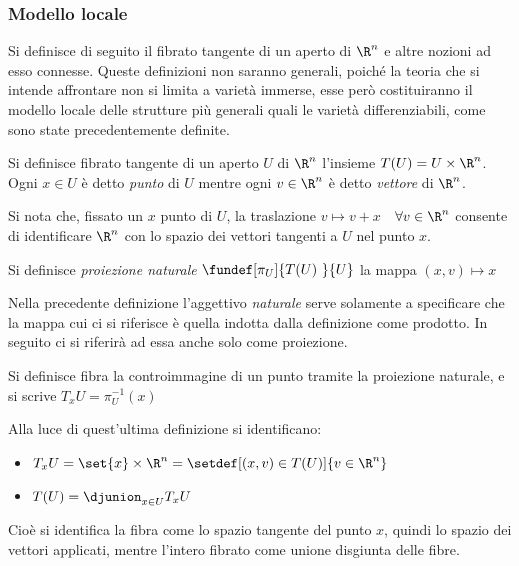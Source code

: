 
\subsubsection{Modello locale} %

Si definisce di seguito il fibrato tangente di un aperto di $\R ^n$ e altre nozioni ad esso connesse.
Queste definizioni non saranno generali, poiché la teoria che si intende affrontare non si limita a varietà immerse, esse però costituiranno il modello locale delle strutture più generali quali le varietà differenziabili, come sono state precedentemente definite.

\begin{defn}
Si definisce fibrato tangente di un aperto $U$ di $\R ^n$ l'insieme $T(U) = U \times \R ^n$. Ogni $x\in U$ è detto \emph{punto} di $U$ mentre ogni $v\in \R ^n$ è detto \emph{vettore} di $\R ^n$.
\end{defn}

Si nota che, fissato un $x$ punto di $U$, la traslazione $v \mapsto v + x$~~$\forall v\in \R ^n$  consente di identificare $\R ^n$ con lo spazio dei vettori tangenti a $U$ nel punto $x$.


\begin{defn}
Si definisce \emph{proiezione naturale} $\fundef[\pi _U]{T(U)~}{U}$ la mappa $(x,v) \mapsto x$
\end{defn}

Nella precedente definizione l'aggettivo \emph{naturale} serve solamente a specificare che la mappa cui ci si riferisce è quella indotta dalla definizione come prodotto. In seguito ci si riferirà ad essa anche solo come proiezione.

\begin{defn}[Fibra]
Si definisce fibra la controimmagine di un punto tramite la proiezione naturale, e si scrive $T_x U = \pi ^{-1} _U (x)$
\end{defn}

Alla luce di quest'ultima definizione si identificano:
\begin{itemize}
\item $T_x U = \set{x} \times \R ^n = \setdef[(x,v)\in T(U)]{v \in \R^n}$
\item $T(U) = \djunion_{x \in U} T_x U$
\end{itemize}
Cioè si identifica la fibra come lo spazio tangente del punto $x$, quindi lo spazio dei vettori applicati, mentre l'intero fibrato come unione disgiunta delle fibre.

